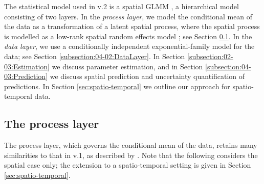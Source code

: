 \documentclass[article]{jss}
\begin{document}
The statistical model used in  v.2 is a spatial GLMM \citep{Diggle_1998_spatial_GLMM}, a hierarchical model consisting of two layers.
 In the %
\textit{process layer}, we model the conditional mean of the data as a transformation of a latent spatial process, where the spatial process is modelled as a low-rank spatial random effects model \citep{Cressie_Johannesson_2008_FRK, Sengupta_Cressie_2013_spatial_GLMM_FRK}; see Section  \ref{subsection:04-01:ProcessLayer}. 
 In the %
\textit{data layer}, we use a conditionally independent exponential-family model for the data; see Section \ref{subsection:04-02:DataLayer}. 
In Section \ref{subsection:02-03:Estimation} we discuss parameter estimation, and in Section \ref{subsection:04-03:Prediction} we discuss spatial prediction and uncertainty quantification of predictions.
In Section \ref{sec:spatio-temporal} we outline our approach for spatio-temporal data. 







\subsection{The process layer} \label{subsection:04-01:ProcessLayer}

The process layer, which governs the conditional mean of the data, retains many similarities to that in  v.1, as described by \cite{FRK_paper}. 
 Note that the following considers the spatial case only; the extension to a spatio-temporal setting is given in Section \ref{sec:spatio-temporal}. 
 
\end{document}
